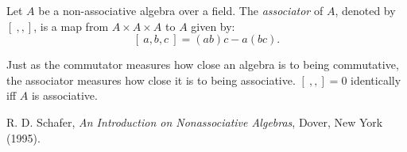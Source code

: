 \documentclass[12pt]{article}
\begin{document}

Let $A$ be a non-associative algebra over a field.  The \emph{associator} of $A$, denoted by $[\ , , ]$, is a  map from $A\times A\times A$ to $A$ given by:
$$[\ a,b,c\ ]=(ab)c-a(bc).$$
\par
Just as the commutator measures how close an algebra is to being commutative, the associator measures how close it is to being associative.  $[\ , , ]=0$ identically iff $A$ is associative.
\par
\begin{thebibliography}{8}
 R. D. Schafer, {\em An Introduction on Nonassociative Algebras}, Dover, New York (1995).
\end{thebibliography}
\end{document}
